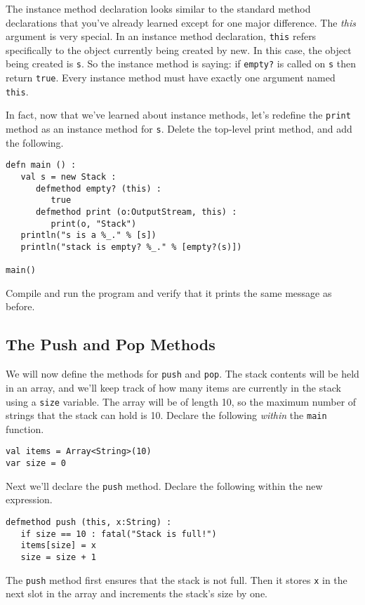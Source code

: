 \documentclass[10pt,oneside]{book}
\begin{document}
The instance method declaration looks similar to the standard method declarations that you've already learned except for one major difference. The {\em this} argument is very special. In an instance method declaration, \texttt{\frenchspacing this} refers specifically to the object currently being created by new. In this case, the object being created is \texttt{\frenchspacing s}. So the instance method is saying: if \texttt{\frenchspacing empty?} is called on \texttt{\frenchspacing s} then return \texttt{\frenchspacing true}. Every instance method must have exactly one argument named \texttt{\frenchspacing this}.

In fact, now that we've learned about instance methods, let's redefine the \texttt{\frenchspacing print} method as an instance method for \texttt{\frenchspacing s}. Delete the top-level print method, and add the following.
\begin{lstlisting}
defn main () :
   val s = new Stack :
      defmethod empty? (this) :
         true
      defmethod print (o:OutputStream, this) :
         print(o, "Stack")
   println("s is a %_." % [s])
   println("stack is empty? %_." % [empty?(s)])

main()
\end{lstlisting}
Compile and run the program and verify that it prints the same message as before.

\subsection*{The Push and Pop Methods}
We will now define the methods for \texttt{\frenchspacing push} and \texttt{\frenchspacing pop}. The stack contents will be held in an array, and we'll keep track of how many items are currently in the stack using a \texttt{\frenchspacing size} variable. The array will be of length 10, so the maximum number of strings that the stack can hold is 10. Declare the following {\em within} the \texttt{\frenchspacing main} function.
\begin{lstlisting}
val items = Array<String>(10)
var size = 0
\end{lstlisting}

Next we'll declare the \texttt{\frenchspacing push} method. Declare the following within the new expression.
\begin{lstlisting}
defmethod push (this, x:String) :
   if size == 10 : fatal("Stack is full!")
   items[size] = x
   size = size + 1
\end{lstlisting}
The \texttt{\frenchspacing push} method first ensures that the stack is not full. Then it stores \texttt{\frenchspacing x} in the next slot in the array and increments the stack's size by one.
\end{document}
